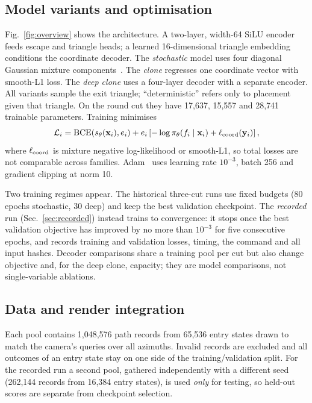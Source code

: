 \documentclass[conference]{IEEEtran}
\begin{document}
\subsection{Model variants and optimisation}
Fig.~\ref{fig:overview} shows the architecture. A two-layer, width-64 SiLU
encoder feeds escape and triangle heads; a learned
16-dimensional triangle embedding conditions the coordinate decoder. The
\emph{stochastic} model uses four diagonal Gaussian mixture
components~\cite{bishop1994}. The \emph{clone} regresses one coordinate vector
with smooth-L1 loss. The \emph{deep clone} uses a four-layer decoder with a
separate encoder. All variants sample the exit triangle; ``deterministic''
refers only to placement given that triangle. On the round cut they have
17,637, 15,557 and 28,741 trainable parameters. Training minimises
\begin{equation}
 \mathcal L_i=\operatorname{BCE}(s_\theta(\mathbf{x}_i),e_i)
 +e_i\left[-\log\pi_\theta(f_i\mid\mathbf{x}_i)
 +\ell_{\rm coord}(\mathbf{y}_i)\right],
\end{equation}
where $\ell_{\rm coord}$ is mixture negative log-likelihood or smooth-L1, so
total losses are not comparable across families. Adam~\cite{kingma2015} uses
learning rate $10^{-3}$, batch 256 and gradient clipping at norm 10.

Two training regimes appear. The historical three-cut runs use fixed budgets
(80 epochs stochastic, 30 deep) and keep the best validation checkpoint. The
\emph{recorded} run (Sec.~\ref{sec:recorded}) instead trains to convergence: it
stops once the best validation objective has improved by no more than $10^{-3}$
for five consecutive epochs, and records training and validation losses, timing,
the command and all input hashes. Decoder comparisons share a training pool per
cut but also change objective and, for the deep clone, capacity; they are model
comparisons, not single-variable ablations.

\subsection{Data and render integration}
Each pool contains 1,048,576 path records from 65,536 entry states drawn to
match the camera's queries over all azimuths. Invalid records are excluded and
all outcomes of an entry state stay on one side of the training/validation
split. For the recorded run a second pool, gathered independently with a
different seed (262,144 records from 16,384 entry states), is used \emph{only}
for testing, so held-out scores are separate from checkpoint selection.
\end{document}
